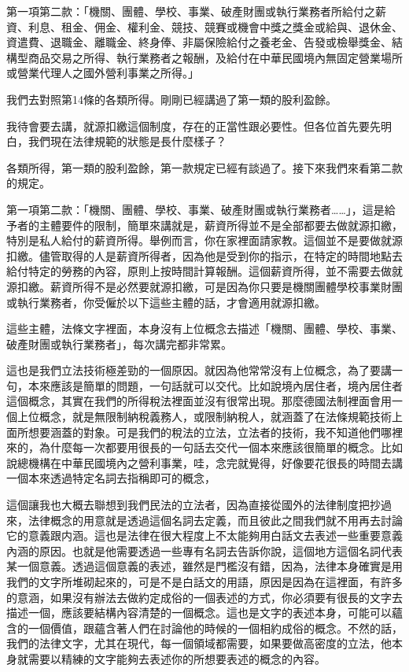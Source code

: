 \documentclass[oneside,sub3section]{ctexbook}
\begin{document}
第一項第二款：「機關、團體、學校、事業、破產財團或執行業務者所給付之薪資、利息、租金、佣金、權利金、競技、競賽或機會中獎之獎金或給與、退休金、資遣費、退職金、離職金、終身俸、非屬保險給付之養老金、告發或檢舉獎金、結構型商品交易之所得、執行業務者之報酬，及給付在中華民國境內無固定營業場所或營業代理人之國外營利事業之所得。」

我們去對照第14條的各類所得。剛剛已經講過了第一類的股利盈餘。

我待會要去講，就源扣繳這個制度，存在的正當性跟必要性。但各位首先要先明白，我們現在法律規範的狀態是長什麼樣子？

各類所得，第一類的股利盈餘，第一款規定已經有談過了。接下來我們來看第二款的規定。

第一項第二款：「機關、團體、學校、事業、破產財團或執行業務者\ldots\ldots」，這是給予者的主體要件的限制，簡單來講就是，薪資所得並不是全部都要去做就源扣繳，特別是私人給付的薪資所得。舉例而言，你在家裡面請家教。這個並不是要做就源扣繳。儘管取得的人是薪資所得者，因為他是受到你的指示，在特定的時間地點去給付特定的勞務的內容，原則上按時間計算報酬。這個薪資所得，並不需要去做就源扣繳。薪資所得不是必然要就源扣繳，可是因為你只要是機關團體學校事業財團或執行業務者，你受僱於以下這些主體的話，才會適用就源扣繳。

這些主體，法條文字裡面，本身沒有上位概念去描述「機關、團體、學校、事業、破產財團或執行業務者」，每次講完都非常累。

這也是我們立法技術極差勁的一個原因。就因為他常常沒有上位概念，為了要講一句，本來應該是簡單的問題，一句話就可以交代。比如說境內居住者，境內居住者這個概念，其實在我們的所得稅法裡面並沒有很常出現。那麼德國法制裡面會用一個上位概念，就是無限制納稅義務人，或限制納稅人，就涵蓋了在法條規範技術上面所想要涵蓋的對象。可是我們的稅法的立法，立法者的技術，我不知道他們哪裡來的，為什麼每一次都要用很長的一句話去交代一個本來應該很簡單的概念。比如說總機構在中華民國境內之營利事業，哇，念完就覺得，好像要花很長的時間去講一個本來透過特定名詞去指稱即可的概念，

這個讓我也大概去聯想到我們民法的立法者，因為直接從國外的法律制度把抄過來，法律概念的用意就是透過這個名詞去定義，而且彼此之間我們就不用再去討論它的意義跟内涵。這也是法律在很大程度上不太能夠用白話文去表述一些重要意義內涵的原因。也就是他需要透過一些專有名詞去告訴你說，這個地方這個名詞代表某一個意義。透過這個意義的表述，雖然是門檻沒有錯，因為，法律本身確實是用我們的文字所堆砌起來的，可是不是白話文的用語，原因是因為在這裡面，有許多的意涵，如果沒有辦法去做約定成俗的一個表述的方式，你必須要有很長的文字去描述一個，應該要結構內容清楚的一個概念。這也是文字的表述本身，可能可以蘊含的一個價值，跟蘊含著人們在討論他的時候的一個相約成俗的概念。不然的話，我們的法律文字，尤其在現代，每一個領域都需要，如果要做高密度的立法，他本身就需要以精練的文字能夠去表述你的所想要表述的概念的內容。
\end{document}
